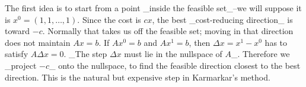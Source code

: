The first idea is to start from a point _inside the feasible set_--we will suppose it is \(x^{0}=(1,1,\ldots,1)\). Since the cost is \(cx\), the best _cost-reducing direction_ is toward \(-c\). Normally that takes us off the feasible set; moving in that direction does not maintain \(Ax=b\). If \(Ax^{0}=b\) and \(Ax^{1}=b\), then \(\Delta x=x^{1}-x^{0}\) has to satisfy \(A\Delta x=0\). _The step \(\Delta x\) must lie in the nullspace of \(A\)_. Therefore we _project \(-c\)_ onto the nullspace, to find the feasible direction closest to the best direction. This is the natural but expensive step in Karmarkar's method.

 